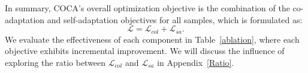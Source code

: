  

In summary, COCA's overall optimization objective is the combination of the co-adaptation and self-adaptation objectives for all samples, which is formulated as:
\begin{equation}
\label{fullloss}
    \mathcal{L} =\mathcal{L}_{col} + \mathcal{L}_{sa}.
\end{equation}
We evaluate the effectiveness of each component in Table~\ref{ablation}, where each objective exhibits incremental improvement. We will discuss the influence of exploring the ratio between $\mathcal{L}_{col}$ and $\mathcal{L}_{sa}$ in Appendix~\ref{Ratio}.




